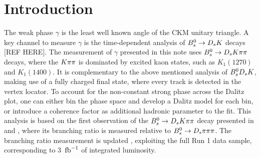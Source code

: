
\section{Introduction}
\label{sec:Introduction}

The weak phase $\gamma$ is the least well known angle of the CKM unitary triangle. A key channel to measure $\gamma$ is the time-dependent analysis of ${{B}^0_{s}}\rightarrow{\ensuremath{{D}_{s}}}{\ensuremath{K}}$ decays [REF HERE]. \newline
The measurement of $\gamma$ presented in this note uses ${{B}^0_{s}}\rightarrow{\ensuremath{{D}_{s}}}{\ensuremath{K}}\pi\pi$ decays, where the ${K}{\pi}{\pi}$ is dominated by excited kaon states, such as $K_{1}(1270)$ and $K_{1}(1400)$. 
It is complementary to the above mentioned analysis of ${{B}^0_{s}}{{D}_{s}}{K}$, making use of a fully charged final state, where every track is detected in the vertex locator. 
To account for the non-constant strong phase across the Dalitz plot, one can either bin the phase space and develop a Dalitz model for each bin, or introduce a coherence factor as additional hadronic parameter to the fit. \newline
This analysis is based on the first observation of the ${{B}^0_{s}}\rightarrow{\ensuremath{{D}_{s}}}{\ensuremath{K}}{\ensuremath{\pi}}{\ensuremath{\pi}}$ decay presented in \cite{Blusk:1471393} and \cite{Blusk:2012it}, where its branching ratio is measured relative to ${{B}^0_{s}}\rightarrow{\ensuremath{{D}_{s}}}{\ensuremath{\pi}}{\ensuremath{\pi}}{\ensuremath{\pi}}$. 
The branching ratio measurement is updated
, exploiting the full Run 1 data sample, corresponding to 3 $\mbox{\,fb}^{-1}$ of integrated luminosity.         
